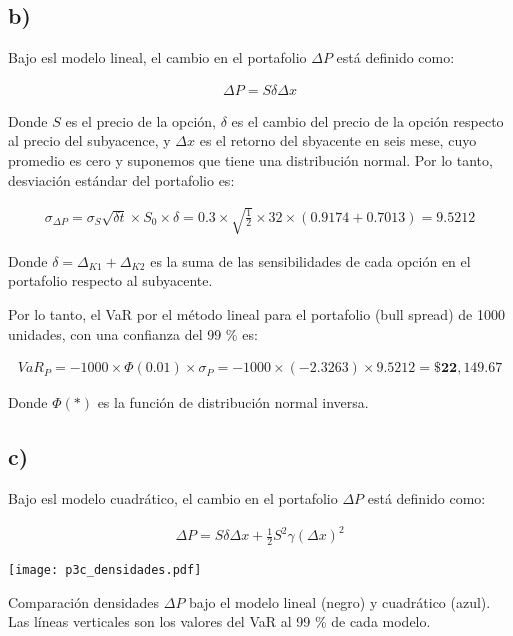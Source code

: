 \documentclass{tufte-handout}
\begin{document}
\subsection*{b)}

Bajo esl modelo lineal, el cambio en el portafolio $\Delta P$ está definido como:

\begin{align*}
	\Delta P = S \delta \Delta x
\end{align*}

Donde $S$ es el precio de la opción, $\delta$ es el cambio del precio de la opción respecto al precio del subyacence, y $\Delta x$ es el retorno del sbyacente en seis mese, cuyo promedio es cero y suponemos que tiene una distribución normal. Por lo tanto, desviación estándar del portafolio es:

\begin{align*}
	\sigma_{\Delta P} = \sigma_S \sqrt{\delta t} \times S_0 \times \delta= 0.3 \times \sqrt{\frac{1}{2}} \times 32 \times (0.9174 + 0.7013) = 9.5212
\end{align*}

Donde $\delta = \Delta_{K1}+\Delta_{K2}$ es la suma de las sensibilidades de cada opción en el portafolio respecto al subyacente.

Por lo tanto, el VaR por el método lineal para el portafolio (bull spread) de 1000 unidades, con una confianza del 99 \% es:

\begin{align*}
	VaR_P = -1000\times\Phi(0.01) \times \sigma_P  = -1000 \times (-2.3263) \times 9.5212 = \mathbf{\$ 22,149.67}
\end{align*}

Donde $\Phi(*)$ es la función de distribución normal inversa.

\subsection*{c)}

Bajo esl modelo cuadrático, el cambio en el portafolio $\Delta P$ está definido como:

\begin{align*}
	\Delta P = S \delta \Delta x + \frac{1}{2} S^2 \gamma (\Delta x)^2
\end{align*}


\begin{marginfigure}[2cm]
\centering
\texttt{[image: p3c\_densidades.pdf]}
\caption{Comparación densidades $\Delta P$ bajo el modelo lineal (negro) y cuadrático (azul). Las líneas verticales son los valores del VaR al 99 \% de cada modelo.}
\label{fig:p3c_densidades}
\end{marginfigure}
\end{document}
